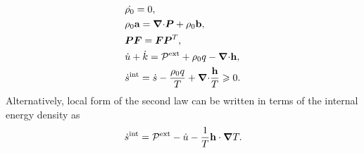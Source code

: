 \begin{subequations}
  \begin{align}
     & \dot{\rho_0} = 0,                                                                                                                \\
     & \rho_0 \textbf{a} = {\boldsymbol{\nabla} \cdot} \boldsymbol{P} + \rho_0\textbf{b},                                                                                     \\
     & \boldsymbol{P}\boldsymbol{F} = \boldsymbol{F}\boldsymbol{P}^T,                                                                                                   \\
     & \dot{u} + \dot{k} = \mathcal{P}^\text{ext} + \rho_0 q - {\boldsymbol{\nabla} \cdot} \textbf{h},                                                        \\
     & \dot{s}^\text{int} = \dot{s} - \dfrac{\rho_0 q}{T} + {\boldsymbol{\nabla} \cdot} \dfrac{\textbf{h}}{T} \geqslant 0. \label{eq: dissipation inequality} 
  \end{align}
\end{subequations}
Alternatively, local form of the second law can be written in terms of the internal energy density as
\begin{align}
  \dot{s}^\text{int} = \mathcal{P}^\text{ext} - \dot{u} - \dfrac{1}{T} \textbf{h} \cdot \boldsymbol{\nabla} T. \label{eq: dissipation inequality 2}
\end{align}


